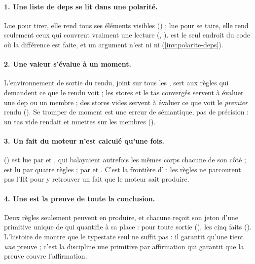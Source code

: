 \paragraph{1. Une liste de deps se lit dans une polarité.} Lue pour tirer, elle rend tous ses éléments visibles () ; lue pour se taire, elle rend seulement ceux qui couvrent vraiment une lecture (, ).  est le seul endroit du code où la différence est faite, et un argument  n'est ni  ni \code{[]} (\cref{inv:polarite-deps}).

\paragraph{2. Une valeur s'évalue à un moment.} L'environnement de sortie du rendu, joint sur tous les , sert aux règles qui demandent \og ce que le rendu voit\fg{} ; les stores et le tas convergés servent à évaluer une dep ou un membre ; des stores vides servent à évaluer ce que voit le \emph{premier} rendu (). Se tromper de moment est une erreur de sémantique, pas de précision : un tas vide rendait  et  muettes sur les membres ().

\paragraph{3. Un fait du moteur n'est calculé qu'une fois.}  () est lue par  et , qui balayaient autrefois les mêmes corps chacune de son côté ;  est lu par quatre règles ;  par  et . C'est la frontière d' : les règles ne parcourent pas l'IR pour y retrouver un fait que le moteur sait produire.

\paragraph{4. Une \Error{} est la preuve de toute la conclusion.} Deux règles seulement peuvent en produire, et chacune reçoit son jeton d'une primitive unique de  qui quantifie à sa place : \og pour toute sortie\fg{} (), \og les cinq faits\fg{} (). L'histoire de  montre que le typestate seul ne suffit pas : il garantit qu'une \Error{} tient \emph{une} preuve ; c'est la discipline \og une primitive par affirmation\fg{} qui garantit que la preuve couvre l'affirmation.

